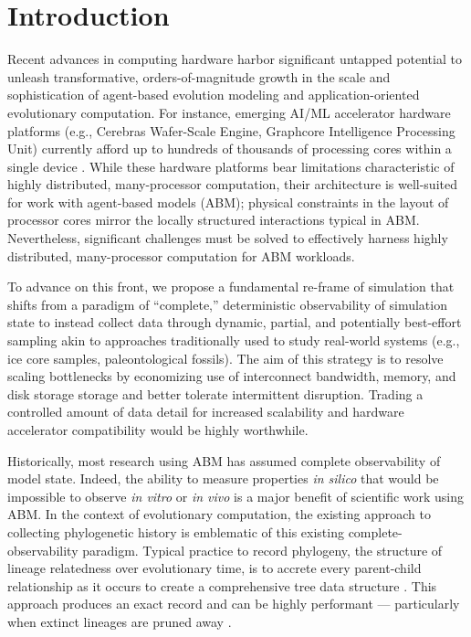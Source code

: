 \section{Introduction} \label{sec:introduction}

Recent advances in computing hardware harbor significant untapped potential to unleash transformative, orders-of-magnitude growth in the scale and sophistication of agent-based evolution modeling and application-oriented evolutionary computation.
For instance, emerging AI/ML accelerator hardware platforms (e.g., Cerebras Wafer-Scale Engine, Graphcore Intelligence Processing Unit) currently afford up to hundreds of thousands of processing cores within a single device \citep{lauterbach2021path,jia2019dissecting}.
While these hardware platforms bear limitations characteristic of highly distributed, many-processor computation, their architecture is well-suited for work with agent-based models (ABM); physical constraints in the layout of processor cores mirror the locally structured interactions typical in ABM.
Nevertheless, significant challenges must be solved to effectively harness highly distributed, many-processor computation for ABM workloads.

To advance on this front, we propose a fundamental re-frame of simulation that shifts from a paradigm of ``complete,'' deterministic observability of simulation state to instead collect data through dynamic, partial, and potentially best-effort sampling akin to approaches traditionally used to study real-world systems (e.g., ice core samples, paleontological fossils).
The aim of this strategy is to resolve scaling bottlenecks by economizing use of interconnect bandwidth, memory, and disk storage storage and better tolerate intermittent disruption.
Trading a controlled amount of data detail for increased scalability and hardware accelerator compatibility would be highly worthwhile.

Historically, most research using ABM has assumed complete observability of model state.
Indeed, the ability to measure properties \textit{in silico} that would be impossible to observe \textit{in vitro} or \textit{in vivo} is a major benefit of scientific work using ABM.
In the context of evolutionary computation, the existing approach to collecting phylogenetic history is emblematic of this existing complete-observability paradigm.
Typical practice to record phylogeny, the structure of lineage relatedness over evolutionary time, is to accrete every parent-child relationship as it occurs to create a comprehensive tree data structure \citep{moreno2024algorithms}.
This approach produces an exact record and can be highly performant --- particularly when extinct lineages are pruned away \citep{dolson2024phylotrackpy}.

